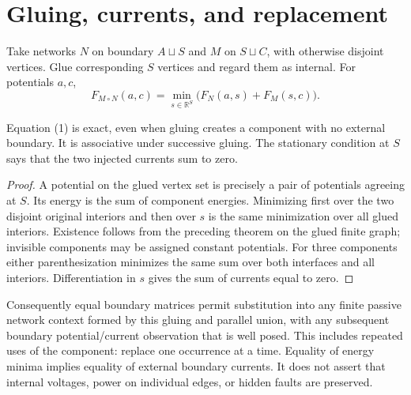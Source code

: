 \documentclass[11pt]{article}
\begin{document}
\section{Gluing, currents, and replacement}
Take networks $N$ on boundary $A\sqcup S$ and $M$ on $S\sqcup C$, with otherwise disjoint vertices. Glue corresponding $S$ vertices and regard them as internal. For potentials $a,c$,
\[ F_{M\circ N}(a,c)=\min_{s\in\mathbb R^S}\bigl(F_N(a,s)+F_M(s,c)\bigr).\tag{1}\]
\begin{proposition}
Equation (1) is exact, even when gluing creates a component with no external boundary. It is associative under successive gluing. The stationary condition at $S$ says that the two injected currents sum to zero.
\end{proposition}
\begin{proof}
A potential on the glued vertex set is precisely a pair of potentials agreeing at $S$. Its energy is the sum of component energies. Minimizing first over the two disjoint original interiors and then over $s$ is the same minimization over all glued interiors. Existence follows from the preceding theorem on the glued finite graph; invisible components may be assigned constant potentials. For three components either parenthesization minimizes the same sum over both interfaces and all interiors. Differentiation in $s$ gives the sum of currents equal to zero.
\end{proof}
Consequently equal boundary matrices permit substitution into any finite passive network context formed by this gluing and parallel union, with any subsequent boundary potential/current observation that is well posed. This includes repeated uses of the component: replace one occurrence at a time. Equality of energy minima implies equality of external boundary currents. It does not assert that internal voltages, power on individual edges, or hidden faults are preserved.
\end{document}
